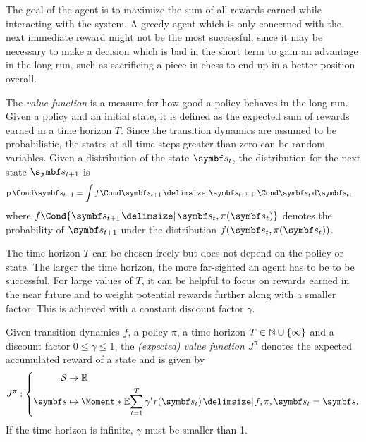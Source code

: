 The goal of the agent is to maximize the sum of all rewards earned while interacting with the system.
A greedy agent which is only concerned with the next immediate reward might not be the most successful, since it may be necessary to make a decision which is bad in the short term to gain an advantage in the long run, such as sacrificing a piece in chess to end up in a better position overall.

The \emph{value function} is a measure for how good a policy behaves in the long run.
Given a policy and an initial state, it is defined as the expected sum of rewards earned in a time horizon $T$.
Since the transition dynamics are assumed to be probabilistic, the states at all time steps greater than zero can be random variables.
Given a distribution of the state $\mat{s_t}$, the distribution for the next state $\mat{s_{t+1}}$ is
\begin{align}
    \Prob{\mat{s_{t+1}}} &= \int \Fun{f}{\mat{s_{t+1}} \given \mat{s_t}, \pi}\Prob{\mat{s_t}} \diff \mat{s_t},
\end{align}
where $f\Cond{\mat{s_{t+1}} \given \mat{s_t}, \pi(\mat{s_t})}$ denotes the probability of $\mat{s_{t+1}}$ under the distribution $f(\mat{s_t}, \pi(\mat{s_t}))$.

The time horizon $T$ can be chosen freely but does not depend on the policy or state.
The larger the time horizon, the more far-sighted an agent has to be to be successful.
For large values of $T$, it can be helpful to focus on rewards earned in the near future and to weight potential rewards further along with a smaller factor.
This is achieved with a constant discount factor $\gamma$.
\begin{definition}
    \label{def:old_value_function}
    Given transition dynamics $f$, a policy $\pi$, a time horizon $T \in \mathbb{N} \cup \left\{ \infty \right\}$ and a discount factor $0 \leq \gamma \leq 1$, the \emph{(expected) value function $J^\pi$} denotes the expected accumulated reward of a state and is given by
    \begin{align}
        J^\pi : \left\{
            \begin{aligned}
                \Sc &\to \Rb \\
                \mat{s} &\mapsto \Moment*{\E}{\sum_{t=1}^T \gamma^t r(\mat{s}_t) \given f, \pi, \mat{s}_t = \mat{s}}.
            \end{aligned}
        \right.
    \end{align}
    If the time horizon is infinite, $\gamma$ must be smaller than 1.
\end{definition}

